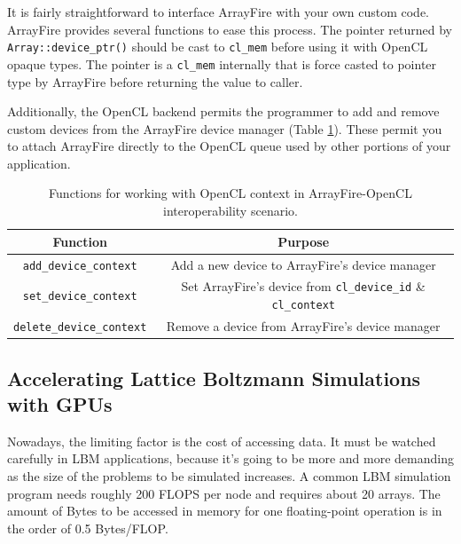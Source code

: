 It is fairly straightforward to interface ArrayFire with your own custom code. ArrayFire provides several functions to ease this process. The pointer returned by \texttt{Array::device_ptr()} should be cast to \texttt{cl_mem} before using it with OpenCL opaque types. The pointer is a \texttt{cl_mem} internally that is force casted to pointer type by ArrayFire before returning the value to caller.

Additionally, the OpenCL backend permits the programmer to add and remove custom devices from the ArrayFire device manager (Table \ref{table:afcl}). These permit you to attach ArrayFire directly to the OpenCL queue used by other portions of your application.

\begin{table}[h!]
	\centering\small
	{\renewcommand{\arraystretch}{1.1}%
		{\setlength{\tabcolsep}{0.4em}
	\begin{tabular}{|c|c|} 
		\hline
		Function & Purpose \\
		\hline
		\texttt{add_device_context} & Add a new device to ArrayFire's device manager \\ 
		\hline
		\texttt{set_device_context} & Set ArrayFire's device from \texttt{cl_device_id} \& \texttt{cl_context} \\
		\hline
		\texttt{delete_device_context} & Remove a device from ArrayFire's device manager \\
		\hline
	\end{tabular}}}
	\caption{Functions for working with OpenCL context in ArrayFire-OpenCL interoperability scenario.}
	\label{table:afcl}
\end{table}

\subsection{Accelerating Lattice Boltzmann Simulations with GPUs}

Nowadays, the limiting factor is the cost of accessing data. It must be watched carefully in LBM applications, because it's going to be more and more demanding as the size of the problems to be simulated increases. A common LBM simulation program needs roughly 200 FLOPS per node and requires about 20 arrays. The amount of Bytes to be accessed in memory for one floating-point operation is in the order of 0.5 Bytes/FLOP. 


